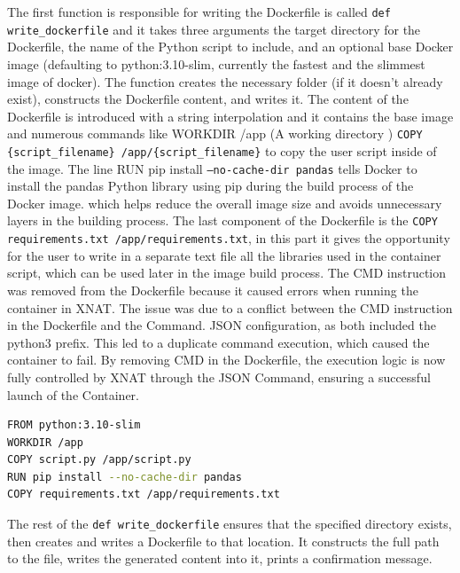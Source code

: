 The first function is responsible for writing the Dockerfile is called \texttt{def write\_dockerfile} and it takes three arguments the target directory for the Dockerfile, the name of the Python script to include, and an optional base Docker image (defaulting to python:3.10-slim, currently the fastest and the slimmest image of docker). The function creates the necessary folder (if it doesn't already exist), constructs the Dockerfile content, and writes it. The content of the Dockerfile is introduced with a string interpolation and it contains the base image and numerous commands like WORKDIR /app (A working directory ) \texttt{COPY \{script\_filename\} /app/\{script\_filename\}} to copy the user script inside of the image. The line  RUN pip install \texttt{--no-cache-dir pandas} tells Docker to install the pandas Python library using pip during the build process of the Docker image.  which helps reduce the overall image size and avoids unnecessary layers in the building process. The last component of the Dockerfile is the \texttt{COPY requirements.txt /app/requirements.txt}, in this part it gives the opportunity for the user to write in a separate text file all the libraries used in the container script, which can be used later in the image build process.
The CMD instruction was removed from the Dockerfile because it caused errors when running the container in XNAT. The issue was due to a conflict between the CMD instruction in the Dockerfile and the Command. JSON configuration, as both included the python3 prefix. This led to a duplicate command execution, which caused the container to fail. By removing CMD in the Dockerfile, the execution logic is now fully controlled by XNAT through the JSON Command, ensuring a successful launch of the Container.

\begin{lstlisting}[language=bash,caption={Dockerfile}]
FROM python:3.10-slim
WORKDIR /app
COPY script.py /app/script.py
RUN pip install --no-cache-dir pandas
COPY requirements.txt /app/requirements.txt
\end{lstlisting}

The rest of the \texttt{def write\_dockerfile} ensures that the specified directory exists, then creates and writes a Dockerfile to that location. It constructs the full path to the file, writes the generated content into it, prints a confirmation message.



